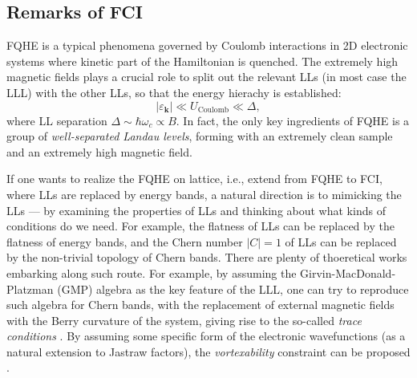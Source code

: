 \subsection{Remarks of FCI}
FQHE is a typical phenomena governed by Coulomb interactions in 2D electronic systems where kinetic part of the Hamiltonian is quenched. The extremely high magnetic fields plays a crucial role to split out the relevant LLs (in most case the LLL) with the other LLs, so that the energy hierachy is established:
\begin{equation*}
    |\varepsilon_{\bm k}| \ll U_{\text{Coulomb}} \ll \Delta,
\end{equation*}
where LL separation $\Delta\sim\hbar\omega_c\propto B$. In fact, the only key ingredients of FQHE is a group of \emph{well-separated Landau levels}, forming with an extremely clean sample and an extremely high magnetic field.

If one wants to realize the FQHE on lattice, i.e., extend from FQHE to FCI, where LLs are replaced by energy bands, a natural direction is to mimicking the LLs --- by examining the properties of LLs and thinking about what kinds of conditions do we need. For example, the flatness of LLs can be replaced by the flatness of energy bands, and the Chern number $|C|=1$ of LLs can be replaced by the non-trivial topology of Chern bands. There are plenty of thoeretical works embarking along such route. For example, by assuming the Girvin-MacDonald-Platzman (GMP) algebra \cite{girvin1986magneto} as the key feature of the LLL, one can try to reproduce such algebra for Chern bands, with the replacement of external magnetic fields with the Berry curvature of the system, giving rise to the so-called \emph{trace conditions} \cite{parameswaran2012fractional}. By assuming some specific form of the electronic wavefunctions (as a natural extension to Jastraw factors), the \emph{vortexability} constraint can be proposed \cite{ledwith2023vortexability}.

